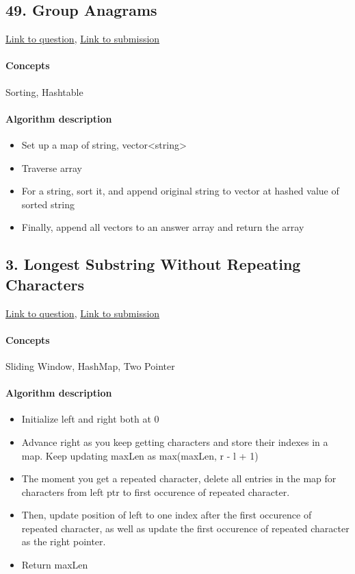 \documentclass[11pt]{book}
\begin{document}
\subsection{49. Group Anagrams}
\href{https://leetcode.com/problems/group-anagrams/}{Link to question},
\href{https://leetcode.com/submissions/detail/335928725/}{Link to submission}
\paragraph{Concepts}
Sorting, Hashtable
\paragraph{Algorithm description}
\begin{itemize}
    \item Set up a map of string, vector<string>
    \item Traverse array
    \item For a string, sort it, and append original string to vector at hashed value of sorted string
    \item Finally, append all vectors to an answer array and return the array
\end{itemize}

\subsection{3. Longest Substring Without Repeating Characters}
\href{https://leetcode.com/problems/longest-substring-without-repeating-characters/}{Link to question},
\href{https://leetcode.com/submissions/detail/336804625/}{Link to submission}
\paragraph{Concepts}
Sliding Window, HashMap, Two Pointer
\paragraph{Algorithm description}
\begin{itemize}
    \item Initialize left and right both at 0
    \item Advance right as you keep getting characters and store their indexes in a map. Keep updating maxLen as max(maxLen, r - l + 1)
    \item The moment you get a repeated character, delete all entries in the map for characters from left ptr to first occurence of repeated character.
    \item Then, update position of left to one index after the first occurence of repeated character, as well as update the first occurence of repeated character as the right pointer.
    \item Return maxLen
\end{itemize}
\end{document}
